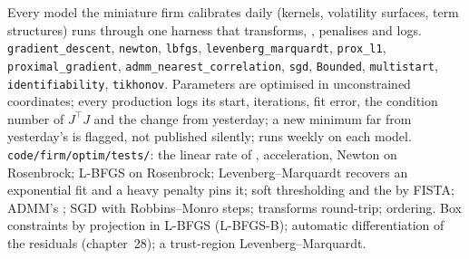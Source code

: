 \begin{build}
 Every model the miniature firm calibrates daily (kernels, volatility surfaces, term structures) runs through one harness that transforms, , penalises and logs.
 \texttt{gradient\_descent}, \texttt{newton}, \texttt{lbfgs}, \texttt{levenberg\_marquardt}, \texttt{prox\_l1}, \texttt{proximal\_gradient}, \texttt{admm\_nearest\_correlation},
\texttt{sgd}, \texttt{Bounded}, \texttt{multistart}, \texttt{identifiability}, \texttt{tikhonov}.
 Parameters are optimised in unconstrained coordinates; every production  logs its start, iterations, fit error, the condition number of $J^\top J$ and the change from
yesterday; a new minimum far from yesterday's is flagged, not published silently;  runs weekly on each model.
 \texttt{code/firm/optim/tests/}: the linear rate of , acceleration, Newton on Rosenbrock; L-BFGS on Rosenbrock; Levenberg--Marquardt recovers an exponential
fit and a heavy penalty pins it; soft thresholding and the  by FISTA; ADMM's ; SGD with Robbins--Monro steps; transforms round-trip;  ordering.
 Box constraints by projection in L-BFGS (L-BFGS-B); automatic differentiation of the residuals (chapter~28); a trust-region Levenberg--Marquardt.
\end{build}

